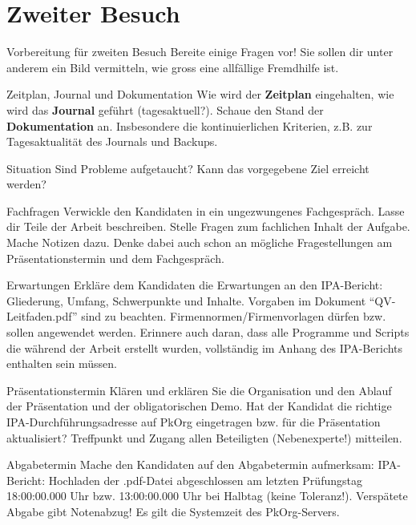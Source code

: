\section{Zweiter Besuch}
\begin{taskitem}{Vorbereitung für zweiten Besuch}
  Bereite einige Fragen vor! Sie sollen dir unter anderem ein Bild vermitteln, wie gross eine allfällige Fremdhilfe ist.
\end{taskitem}
\begin{taskitem}{Zeitplan, Journal und Dokumentation}
  Wie wird der \textbf{Zeitplan} eingehalten, wie wird das \textbf{Journal} geführt (tagesaktuell?). Schaue den Stand der \textbf{Dokumentation} an. Insbesondere die kontinuierlichen Kriterien, z.B. zur Tagesaktualität des Journals und Backups.
\end{taskitem}
\begin{taskitem}{Situation}
  Sind Probleme aufgetaucht? Kann das vorgegebene Ziel erreicht werden?
\end{taskitem}
\begin{taskitem}{Fachfragen}
  Verwickle den Kandidaten in ein ungezwungenes Fachgespräch. Lasse dir Teile der Arbeit beschreiben. Stelle Fragen zum fachlichen Inhalt der Aufgabe. Mache Notizen dazu. Denke dabei auch schon an mögliche Fragestellungen am Präsentationstermin und dem Fachgespräch.
\end{taskitem}
\begin{taskitem}{Erwartungen}
  Erkläre dem Kandidaten die Erwartungen an den IPA-Bericht: Gliederung, Umfang, Schwerpunkte und Inhalte. Vorgaben im Dokument \enquote{QV-Leitfaden.pdf} sind zu beachten. Firmennormen/Firmenvorlagen dürfen bzw. sollen angewendet werden. Erinnere auch daran, dass alle Programme und Scripts die während der Arbeit erstellt wurden, vollständig im Anhang des IPA-Berichts enthalten sein müssen.
\end{taskitem}
\begin{taskitem}{Präsentationstermin}
  Klären und erklären Sie die Organisation und den Ablauf der Präsentation und der obligatorischen Demo. Hat der Kandidat die richtige IPA-Durchführungsadresse auf PkOrg eingetragen bzw. für die Präsentation aktualisiert? Treffpunkt und Zugang allen Beteiligten (Nebenexperte!) mitteilen.
\end{taskitem}
\begin{taskitem}{Abgabetermin}
  Mache den Kandidaten auf den Abgabetermin aufmerksam: IPA-Bericht: Hochladen der .pdf-Datei abgeschlossen am letzten Prüfungstag 18:00:00.000 Uhr bzw. 13:00:00.000 Uhr bei Halbtag (keine Toleranz!). Verspätete Abgabe gibt Notenabzug! Es gilt die Systemzeit des PkOrg-Servers.
\end{taskitem}
